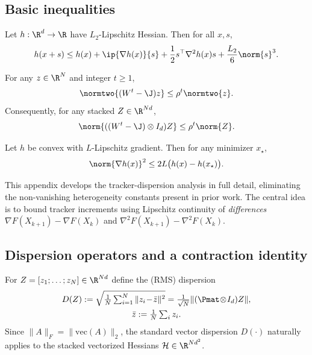 \documentclass[review,onefignum,onetabnum]{siamart171218}
\begin{document}
\subsection{Basic inequalities}\label{ssec:basic}
\begin{lemma}\label{lem:taylor3}
Let $h:\R^d\to\R$ have $L_2$-Lipschitz Hessian. Then for all $x,s$,
\[
h(x+s)\le h(x)+\ip{\nabla h(x)}{s}+\frac12 s^\top\nabla^2 h(x)s+\frac{L_2}{6}\norm{s}^3.
\]
\end{lemma}

\begin{lemma}\label{lem:consensus}
For any $z\in\R^N$ and integer $t\ge 1$,
\[
\normtwo{(W^t-\J)z}\le \rho^t\normtwo{z}.
\]
Consequently, for any stacked $Z\in\R^{Nd}$,
\[
\norm{((W^t-\J)\otimes I_d)Z}\le \rho^t\norm{Z}.
\]
\end{lemma}

\begin{lemma}\label{lem:gap-grad}
Let $h$ be convex with $L$-Lipschitz gradient. Then for any minimizer $x_\star$,
\[
\norm{\nabla h(x)}^2\le 2L\big(h(x)-h(x_\star)\big).
\]
\end{lemma}

This appendix develops the tracker-dispersion analysis in full detail,
eliminating the non-vanishing heterogeneity constants present in prior
work.
The central idea is to bound tracker increments using Lipschitz
continuity of \emph{differences}
$\nabla F(X_{k+1})-\nabla F(X_k)$ and
$\nabla^2F(X_{k+1})-\nabla^2F(X_k)$.

\subsection{Dispersion operators and a contraction identity}

For $Z=[z_1;\dots;z_N]\in\R^{Nd}$ define the (RMS) dispersion
\begin{gather*}
D(Z):=\sqrt{\tfrac1N\textstyle\sum_{i=1}^N\|z_i\!-\!\bar z\|^2}
=\tfrac{1}{\sqrt N}\|(\Pmat\!\otimes\! I_d)Z\|,\\
\bar z:=\tfrac1N\textstyle\sum_i z_i.
\end{gather*}
Since $\|A\|_F = \|\mathrm{vec}(A)\|_2$, the standard vector dispersion $D(\cdot)$ naturally applies to the stacked vectorized Hessians $\mathcal{H} \in \R^{Nd^2}$.
\end{document}

